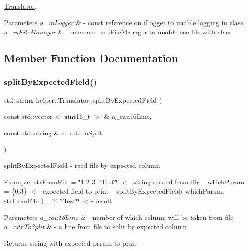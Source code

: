 \mbox{\hyperlink{classhelper_1_1_translator}{Translator}}. 


\begin{DoxyParams}{Parameters}
{\em a\+\_\+ro\+Logger} & -\/ const reference on \mbox{\hyperlink{classi_logger}{i\+Logger}} to unable logging in class \\
\hline
{\em a\+\_\+ro\+File\+Manager} & -\/ reference on \mbox{\hyperlink{classi_file_manager}{i\+File\+Manager}} to unable use file with class. \\
\hline
\end{DoxyParams}


\subsection{Member Function Documentation}
\mbox{\label{classhelper_1_1_translator_a4069ff26b6329f5c6a70ccbfe752f812}} 
\subsubsection{\texorpdfstring{splitByExpectedField()}{splitByExpectedField()}}
{\footnotesize\ttfamily std\+::string helper\+::\+Translator\+::split\+By\+Expected\+Field (\begin{DoxyParamCaption}\item[{const std\+::vector$<$ uint16\+\_\+t $>$ \&}]{a\+\_\+rau16\+Line,  }\item[{const std\+::string \&}]{a\+\_\+rstr\+To\+Split }\end{DoxyParamCaption})\hspace{0.3cm}{\ttfamily [virtual]}}



split\+By\+Expected\+Field -\/ read file by expected column 

Example\+: str\+From\+File = \char`\"{}1 2 3. \char`\"{}Test\char`\"{}\char`\"{} $<$-\/ string readed from file ~\newline
 which\+Param = \{0,3\} $<$-\/ expected field to print ~\newline
 split\+By\+Expected\+Field( which\+Param, str\+From\+File ) = \char`\"{}1 \char`\"{}Test\char`\"{}\char`\"{} $<$-\/ result


\begin{DoxyParams}{Parameters}
{\em a\+\_\+rau16\+Line} & -\/ number of which column will be taken from file \\
\hline
{\em a\+\_\+rstr\+To\+Split} & -\/ a line from file to split by expected column \\
\hline
\end{DoxyParams}
\begin{DoxyReturn}{Returns}
string with expected param to print 
\end{DoxyReturn}


